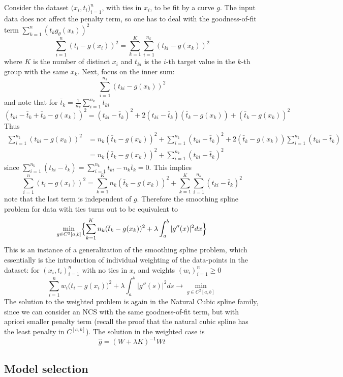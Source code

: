 \documentclass[a4paper]{article}
\begin{document}
Consider the dataset $\bigl(x_i, t_i\bigr)_{i=1}^n$, with ties in $x_i$, to be 
fit by a curve $g$. The input data does not affect the penalty term, so one has
to deal with the goodness-of-fit term $\sum_{k=1}^n (t_k g_\theta(x_k))^2$
\[
\sum_{i=1}^n (t_i - g(x_i) )^2
= \sum_{k=1}^K \sum_{i=1}^{n_k} (t_{ki} - g(x_k) )^2
\]
where $K$ is the number of distinct $x_i$ and $t_{ki}$ is the $i$-th target value
in the $k$-th group with the same $x_k$. Next, focus on the inner sum:
\[\sum_{i=1}^{n_k} (t_{ki} - g(x_k) )^2\]
and note that for $\bar{t}_k = \frac{1}{n_k}\sum_{i=1}^{n_k} t_{ki}$
\[
(t_{ki} - \bar{t}_k + \bar{t}_k - g(x_k) )^2
= (t_{ki} - \bar{t}_k)^2
+ 2 (t_{ki} - \bar{t}_k)(\bar{t}_k - g(x_k) )
+ (\bar{t}_k - g(x_k) )^2
\]
Thus
\begin{align*}
	\sum_{i=1}^{n_k} (t_{ki} - g(x_k) )^2
	&= n_k (\bar{t}_k - g(x_k) )^2
	+ \sum_{i=1}^{n_k} (t_{ki} - \bar{t}_k)^2
	+ 2 (\bar{t}_k - g(x_k) ) \sum_{i=1}^{n_k} (t_{ki} - \bar{t}_k)\\
	&= n_k (\bar{t}_k - g(x_k) )^2 + \sum_{i=1}^{n_k} (t_{ki} - \bar{t}_k)^2
\end{align*}
since $\sum_{i=1}^{n_k} (t_{ki} - \bar{t}_k) = \sum_{i=1}^{n_k} t_{ki} - n_k \bar{t}_k = 0$.
This implies
\[
\sum_{i=1}^n (t_i - g(x_i) )^2
= \sum_{k=1}^K n_k (\bar{t}_k - g(x_k) )^2
+ \sum_{k=1}^K \sum_{i=1}^{n_k} (t_{ki} - \bar{t}_k)^2
\]
note that the last term is independent of $g$. Therefore the smoothing spline problem
for data with ties turns out to be equivalent to
\[
\min_{g\in C^2[a,b]} \Bigl\{
	\sum_{k=1}^K n_k (\bar{t}_k - g(x_k) )^2
	+ \lambda \int_a^b |g''(x)|^2 dx
\Bigr\}
\]
This is an instance of a generalization of the smoothing spline problem, which
essentially is the introduction of individual weighting of the data-points in the
dataset: for $(x_i, t_i)_{i=1}^n$ with no ties in $x_i$ and weights $(w_i)_{i=1}^n\geq 0$
\[
\sum_{i=1}^n w_i \bigl(t_i - g(x_i)\bigr)^2
+ \lambda \int_a^b |g''(s)|^2 ds
\to \min_{g\in C^2[a,b]}
\]
The solution to the weighted problem is again in the Natural Cubic spline family,
since we can consider an NCS with the same goodness-of-fit term, but with apriori
smaller penalty term (recall the proof that the natural cubic spline has the least
penalty in $C^[a,b]$). The solution in the weighted case is
\[\hat{g} = ( W + \lambda K )^{-1} W t\]



\subsection{Model selection} %
\label{sub:model_selection}
\end{document}
